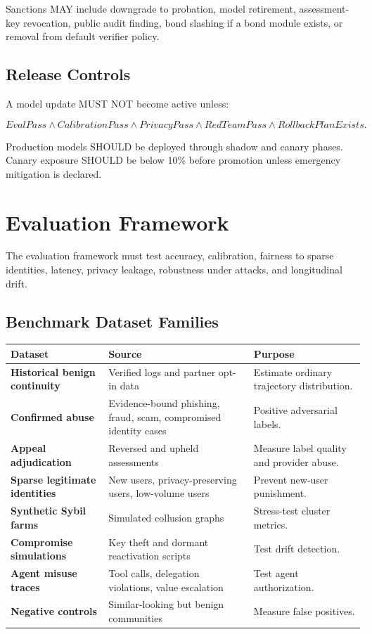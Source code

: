 \documentclass[11pt]{article}
\begin{document}
Sanctions MAY include downgrade to probation, model retirement, assessment-key revocation, public audit finding, bond slashing if a bond module exists, or removal from default verifier policy.

\subsection{Release Controls}

A model update MUST NOT become active unless:

\begin{equation}
EvalPass \land CalibrationPass \land PrivacyPass \land RedTeamPass \land RollbackPlanExists.
\end{equation}

Production models SHOULD be deployed through shadow and canary phases. Canary exposure SHOULD be below 10\% before promotion unless emergency mitigation is declared.

\section{Evaluation Framework}

The evaluation framework must test accuracy, calibration, fairness to sparse identities, latency, privacy leakage, robustness under attacks, and longitudinal drift.

\subsection{Benchmark Dataset Families}

\begin{longtable}{>{\bfseries}p{} p{} p{}}
\toprule
Dataset & Source & Purpose \\
\midrule
Historical benign continuity & Verified logs and partner opt-in data & Estimate ordinary trajectory distribution. \\
Confirmed abuse & Evidence-bound phishing, fraud, scam, compromised identity cases & Positive adversarial labels. \\
Appeal adjudication & Reversed and upheld assessments & Measure label quality and provider abuse. \\
Sparse legitimate identities & New users, privacy-preserving users, low-volume users & Prevent new-user punishment. \\
Synthetic Sybil farms & Simulated collusion graphs & Stress-test cluster metrics. \\
Compromise simulations & Key theft and dormant reactivation scripts & Test drift detection. \\
Agent misuse traces & Tool calls, delegation violations, value escalation & Test agent authorization. \\
Negative controls & Similar-looking but benign communities & Measure false positives. \\
\bottomrule
\end{longtable}
\end{document}
